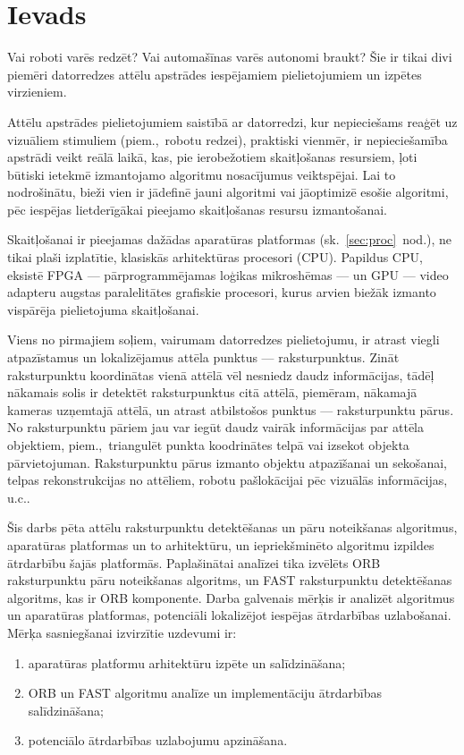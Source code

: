 \section*{Ievads} 
Vai roboti varēs redzēt? Vai automašīnas varēs autonomi braukt?
Šie ir tikai divi piemēri datorredzes attēlu apstrādes iespējamiem pielietojumiem un
izpētes virzieniem. 

Attēlu apstrādes pielietojumiem saistībā ar datorredzi, kur nepieciešams
reaģēt uz vizuāliem stimuliem (piem.,~robotu redzei), praktiski vienmēr, ir
nepieciešamība apstrādi veikt reālā laikā, 
kas, pie ierobežotiem skaitļošanas resursiem, ļoti būtiski ietekmē 
izmantojamo algoritmu nosacījumus veiktspējai. Lai to nodrošinātu,
bieži vien ir jādefinē jauni algoritmi vai jāoptimizē esošie algoritmi,
pēc iespējas lietderīgākai pieejamo skaitļošanas resursu izmantošanai.

Skaitļošanai ir pieejamas dažādas aparatūras platformas (sk.~\ref{sec:proc}~nod.),
ne tikai plaši izplatītie, klasiskās arhitektūras procesori (CPU).
Papildus CPU, eksistē FPGA --- pārprogrammējamas loģikas mikroshēmas --- un
GPU --- video adapteru augstas paralelitātes grafiskie procesori, kurus 
arvien biežāk izmanto vispārēja pielietojuma skaitļošanai.

Viens no pirmajiem soļiem, vairumam datorredzes pielietojumu, ir 
atrast viegli atpazīstamus un lokalizējamus attēla punktus ---
raksturpunktus. Zināt raksturpunktu koordinātas vienā attēlā vēl
nesniedz daudz informācijas, tādēļ nākamais solis ir detektēt raksturpunktus
citā attēlā, piemēram,
nākamajā kameras uzņemtajā attēlā, un atrast atbilstošos punktus ---
raksturpunktu pārus. No raksturpunktu pāriem jau var iegūt daudz vairāk
informācijas par attēla objektiem, piem.,~triangulēt punkta koodrinātes telpā
vai izsekot objekta pārvietojuman. Raksturpunktu
pārus izmanto objektu atpazīšanai un sekošanai,
telpas rekonstrukcijas no attēliem, robotu
pašlokācijai pēc vizuālās informācijas, u.c..

Šis darbs pēta attēlu raksturpunktu detektēšanas un pāru noteikšanas
algoritmus, aparatūras platformas un to arhitektūru, un iepriekšminēto
algoritmu izpildes ātrdarbību šajās platformās. Paplašinātai analīzei tika
izvēlēts ORB raksturpunktu pāru noteikšanas algoritms\cite{ORB}, un FAST
raksturpunktu detektēšanas algoritms\cite{FAST}, kas ir ORB komponente.
Darba galvenais mērķis ir analizēt algoritmus un aparatūras platformas,
potenciāli lokalizējot iespējas ātrdarbības uzlabošanai. Mērķa sasniegšanai
izvirzītie uzdevumi ir:
\begin{enumerate}
	\item aparatūras platformu arhitektūru izpēte un salīdzināšana;
	\item ORB un FAST algoritmu analīze un implementāciju ātrdarbības
		salīdzināšana;
	\item potenciālo ātrdarbības uzlabojumu apzināšana.
\end{enumerate}

